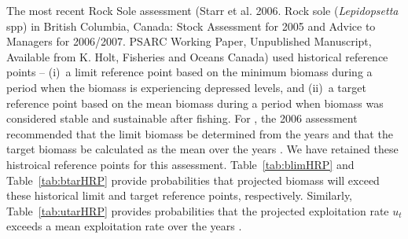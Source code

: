 The most recent Rock Sole assessment (Starr et al. 2006. Rock sole (\emph{Lepidopsetta} spp) in British Columbia, Canada: Stock Assessment for 2005 and Advice to Managers for 2006/2007. PSARC Working Paper, Unpublished Manuscript, Available from K. Holt, Fisheries and Oceans Canada) used historical reference points -- (i)~a limit reference point based on the minimum biomass during a period when the biomass is experiencing depressed levels, and (ii)~a target reference point based on the mean biomass during a period when biomass was considered stable and sustainable after fishing. For , the 2006 assessment recommended that the limit biomass be determined from the years  and that the target biomass be calculated as the mean over the years . We have retained these histroical reference points for this assessment. Table~\ref{tab:blimHRP} and Table~\ref{tab:btarHRP} provide probabilities that projected biomass will exceed these historical limit and target reference points, respectively. Similarly, Table~\ref{tab:utarHRP} provides probabilities that the projected exploitation rate $u_t$ exceeds a mean exploitation rate over the years .



